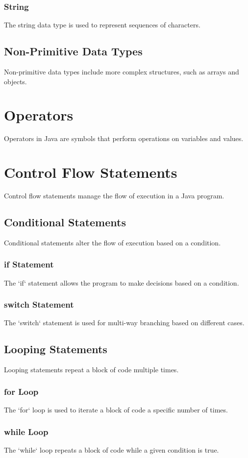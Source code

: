 \documentclass{article}
\begin{document}
\subsubsection{String}
The string data type is used to represent sequences of characters.

\subsection{Non-Primitive Data Types}
Non-primitive data types include more complex structures, such as arrays and objects.

\section{Operators}
Operators in Java are symbols that perform operations on variables and values.

\section{Control Flow Statements}
Control flow statements manage the flow of execution in a Java program.

\subsection{Conditional Statements}
Conditional statements alter the flow of execution based on a condition.

\subsubsection{if Statement}
The `if` statement allows the program to make decisions based on a condition.

\subsubsection{switch Statement}
The `switch` statement is used for multi-way branching based on different cases.

\subsection{Looping Statements}
Looping statements repeat a block of code multiple times.

\subsubsection{for Loop}
The `for` loop is used to iterate a block of code a specific number of times.

\subsubsection{while Loop}
The `while` loop repeats a block of code while a given condition is true.
\end{document}
